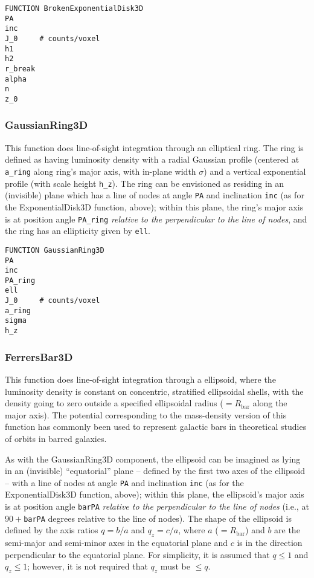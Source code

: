 \documentclass[10pt,a4paper,article]{memoir}
\begin{document}
\begin{verbatim}
FUNCTION BrokenExponentialDisk3D
PA
inc
J_0     # counts/voxel
h1
h2
r_break
alpha
n
z_0
\end{verbatim}




\subsubsection{GaussianRing3D}

This function does line-of-sight integration through an elliptical ring.
The ring is defined as having luminosity density with a radial Gaussian
profile (centered at \texttt{a\_ring} along ring's major axis, with
in-plane width $\sigma$) and a vertical exponential profile (with scale
height \texttt{h\_z}). The ring can be envisioned as residing in an
(invisible) plane which has a line of nodes at angle \texttt{PA} and
inclination \texttt{inc} (as for the ExponentialDisk3D function, above);
within this plane, the ring's major axis is at position angle
\texttt{PA\_ring} \textit{relative to the perpendicular to the line of
nodes}, and the ring has an ellipticity given by \texttt{ell}.

\begin{verbatim}
FUNCTION GaussianRing3D
PA
inc
PA_ring
ell
J_0     # counts/voxel
a_ring
sigma
h_z
\end{verbatim}






\subsubsection{FerrersBar3D}\label{sec:ferrersbar3d}

This function does line-of-sight integration through a \citet{ferrers}
ellipsoid, where the luminosity density is constant on concentric,
stratified ellipsoidal shells, with the density going to zero outside a
specified ellipsoidal radius ($= R_{\mathrm{bar}}$ along the major
axis). The potential corresponding to the mass-density version of this
function has commonly been used to represent galactic bars in
theoretical studies of orbits in barred galaxies.

As with the GaussianRing3D component, the ellipsoid can be imagined as
lying in an (invisible) ``equatorial'' plane -- defined by the first two
axes of the ellipsoid -- with a line of nodes at angle \texttt{PA} and
inclination \texttt{inc} (as for the ExponentialDisk3D function, above);
within this plane, the ellipsoid's major axis is at position angle
\texttt{barPA} \textit{relative to the perpendicular to the line of
nodes} (i.e., at $90 + $\texttt{barPA} degrees relative to the line of
nodes). The shape of the ellipsoid is defined by the axis ratios $q =
b/a$ and $q_{z} = c/a$, where $a$ ($= R_{\mathrm{bar}}$) and $b$ are the
semi-major and semi-minor axes in the equatorial plane and $c$ is in the
direction perpendicular to the equatorial plane. For simplicity, it is
assumed that $q \leq 1$ and $q_{z} \leq 1$; however, it is not required
that $q_{z}$ must be $\leq q$.
\end{document}
